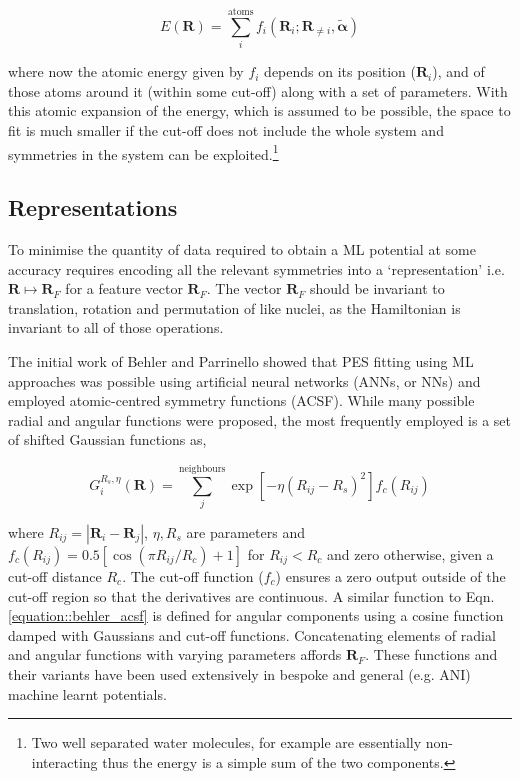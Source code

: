 \documentclass[main.tex]{subfiles}
\begin{document}
\begin{equation}
	E(\boldsymbol{R}) = \sum_i^\text{atoms} f_i (\boldsymbol{R}_i; \boldsymbol{R}_{\ne i}, \tilde{\boldsymbol{\alpha}})
\end{equation}

where now the atomic energy given by $f_i$ depends on its position ($\boldsymbol{R}_i$), and of those atoms around it (within some cut-off) along with a set of parameters. With this atomic expansion of the energy, which is assumed to be possible, the space to fit is much smaller if the cut-off does not include the whole system and symmetries in the system can be exploited.\footnote{Two well separated water molecules, for example are essentially non-interacting thus the energy is a simple sum of the two components.}

\subsection{Representations}

To minimise the quantity of data required to obtain a ML potential at some accuracy requires encoding all the relevant symmetries into a `representation' i.e. $\boldsymbol{R} \mapsto \boldsymbol{R}_F$ for a feature vector $\boldsymbol{R}_F$. The vector $\boldsymbol{R}_F$ should be invariant to translation, rotation and permutation of like nuclei, as the Hamiltonian is invariant to all of those operations.

The initial work of Behler and Parrinello showed that PES fitting using ML approaches was possible using artificial neural networks (ANNs, or NNs) and employed atomic-centred symmetry functions (ACSF).\cite{Behler2007, Behler2011} While many possible radial and angular functions were proposed, the most frequently employed is a set of shifted Gaussian functions as,

\begin{equation}
	G^{R_s, \eta}_i(\boldsymbol{R}) = \sum_j^\text{neighbours} \exp\left[-\eta (R_{ij}- R_s)^2 \right] f_c({R_{ij}})
	\label{equation::behler_acsf}
\end{equation}

where $R_{ij} = |\boldsymbol{R}_i - \boldsymbol{R}_j|$, $\eta, R_s$ are parameters and $f_c(R_{ij}) = 0.5[\cos(\pi R_{ij} / R_c) + 1]$ for $R_{ij} < R_c$ and zero otherwise, given a cut-off distance $R_c$. The cut-off function ($f_c$) ensures a zero output outside of the cut-off region so that the derivatives are continuous. A similar function to Eqn. 
\eqref{equation::behler_acsf} is defined for angular components using a cosine function damped with Gaussians and cut-off functions. Concatenating elements of radial and angular functions with varying parameters affords $\boldsymbol{R}_F$. These functions and their variants have been used extensively in bespoke and general (e.g. ANI\cite{Smith2017}) machine learnt potentials.
\end{document}
